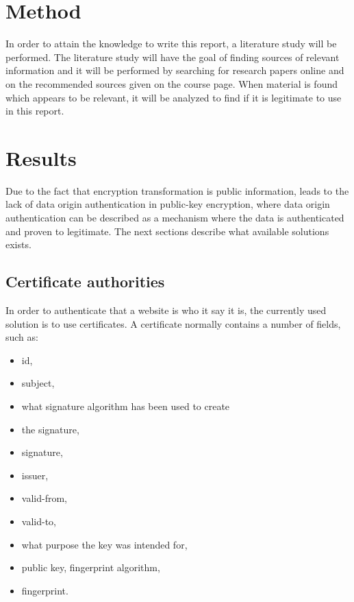 \documentclass{acm_proc_article-sp}
\begin{document}
\section{Method} %
In order to attain the knowledge to write this report, a literature study will be performed. The literature study will have the goal of finding sources of relevant information and it will be performed by searching for research papers online and on the recommended sources given on the course page. When material is found which appears to be relevant, it will be analyzed to find if it is legitimate to use in this report. 



\section{Results}
Due to the fact that encryption transformation is public information, leads to the lack of data origin authentication in public-key encryption, where data origin authentication can be described as a mechanism where the data is authenticated and proven to legitimate. The next sections describe what available solutions exists. %

\subsection{Certificate authorities}
In order to authenticate that a website is who it say it is,
the currently used solution is to use certificates. A certificate
normally contains a number of fields, such as: 
\begin{itemize}
    \item id,
    \item subject, 
    \item what signature algorithm has been used to create
    \item the signature,
    \item signature,
    \item issuer,
    \item valid-from,
    \item valid-to,
    \item what purpose the key was intended for,
    \item public key, fingerprint algorithm,
    \item fingerprint.
\end{itemize}
\end{document}
